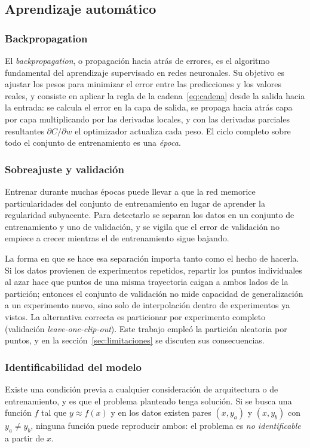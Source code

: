 \documentclass[titlepage,11pt]{article}
\begin{document}
\subsection{Aprendizaje automático}
\label{subsec:ML}

\subsubsection{Backpropagation}
El \emph{backpropagation}, o propagación hacia atrás de errores, es el
algoritmo fundamental del aprendizaje supervisado en redes neuronales. Su
objetivo es ajustar los pesos para minimizar el error entre las predicciones y
los valores reales, y consiste en aplicar la regla de la
cadena~\eqref{eq:cadena} desde la salida hacia la entrada: se calcula el error
en la capa de salida, se propaga hacia atrás capa por capa multiplicando por
las derivadas locales, y con las derivadas parciales resultantes
$\partial C/\partial w$ el optimizador actualiza cada peso. El ciclo completo
sobre todo el conjunto de entrenamiento es una \emph{época}.

\subsubsection{Sobreajuste y validación}
\label{subsubsec:sobreajuste}
Entrenar durante muchas épocas puede llevar a que la red memorice
particularidades del conjunto de entrenamiento en lugar de aprender la
regularidad subyacente. Para detectarlo se separan los datos en un conjunto de
entrenamiento y uno de validación, y se vigila que el error de validación no
empiece a crecer mientras el de entrenamiento sigue bajando.

La forma en que se hace esa separación importa tanto como el hecho de hacerla.
Si los datos provienen de experimentos repetidos, repartir los puntos
individuales al azar hace que puntos de una misma trayectoria caigan a ambos
lados de la partición; entonces el conjunto de validación no mide capacidad de
generalización a un experimento nuevo, sino solo de interpolación dentro de
experimentos ya vistos. La alternativa correcta es particionar por experimento
completo (validación \emph{leave-one-clip-out}). Este trabajo empleó la
partición aleatoria por puntos, y en la sección~\ref{sec:limitaciones} se
discuten sus consecuencias.

\subsubsection{Identificabilidad del modelo}
\label{subsubsec:identificabilidad-teoria}
Existe una condición previa a cualquier consideración de arquitectura o de
entrenamiento, y es que el problema planteado tenga solución. Si se busca una
función $f$ tal que $y\approx f(x)$ y en los datos existen pares $(x,y_a)$ y
$(x,y_b)$ con $y_a\neq y_b$, ninguna función puede reproducir ambos: el
problema es \emph{no identificable} a partir de $x$.
\end{document}
